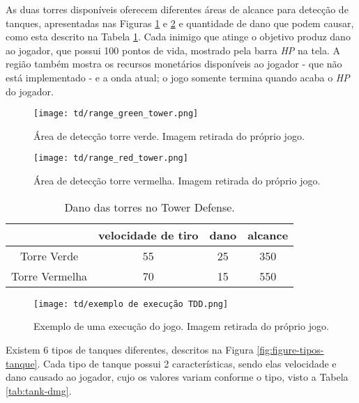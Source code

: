 As duas torres disponíveis oferecem diferentes áreas de alcance para detecção de tanques, apresentadas nas Figuras \ref{fig:td-range-gree} e \ref{fig:td-range-red} e quantidade de dano que podem causar, como esta descrito na Tabela \ref{tab:dados_torres}. Cada inimigo que atinge o objetivo produz dano ao jogador, que possui 100 pontos de vida, mostrado pela barra \textit{HP} na tela. A região também mostra os recursos monetários disponíveis ao jogador - que não está implementado - e a onda atual; o jogo somente termina quando acaba o \textit{HP} do jogador.

\begin{figure}
  \centering
  \texttt{[image: td/range\_green\_tower.png]}
  \caption{Área de detecção torre verde. Imagem retirada do próprio jogo.\label{fig:td-range-gree}}
\end{figure}

\begin{figure}
  \centering
  \texttt{[image: td/range\_red\_tower.png]}
  \caption{Área de detecção torre vermelha. Imagem retirada do próprio jogo.\label{fig:td-range-red}}
\end{figure}

\begin{table}[H]
\caption{Dano das torres no Tower Defense.\label{tab:dados_torres}}
\begin{tabular}{c|ccc}

               & velocidade de tiro  & dano   & alcance\\ \hline
Torre Verde    & 55                  & 25     &  350 \\
Torre Vermelha & 70                  & 15     &  550       

\end{tabular}
\end{table}


\begin{figure}
  \centering
  \texttt{[image: td/exemplo de execução TDD.png]}
  \caption{Exemplo de uma execução do jogo. Imagem retirada do próprio jogo.\label{fig:td-exemplo}}
\end{figure}


Existem 6 tipos de tanques diferentes, descritos na Figura \ref{fig:figure-tipos-tanque}. Cada tipo de tanque possui 2 características, sendo elas velocidade e dano causado ao jogador, cujo os valores variam conforme o tipo, visto a Tabela \ref{tab:tank-dmg}. 


